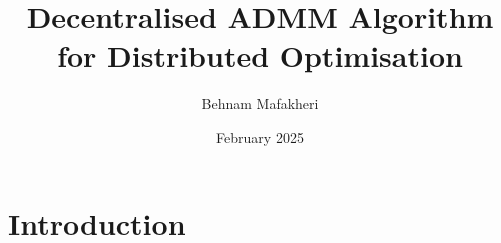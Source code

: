 \documentclass[letterpaper, 10 pt, conference]{ieeeconf}
\title{Decentralised ADMM Algorithm for Distributed Optimisation}
\author{Behnam Mafakheri}
\date{February 2025}
\begin{document}
\maketitle

\section{Introduction}
\end{document}
